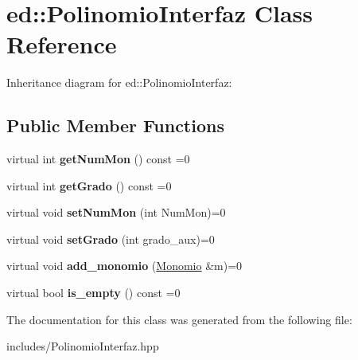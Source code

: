 \hypertarget{classed_1_1PolinomioInterfaz}{}\section{ed\+:\+:Polinomio\+Interfaz Class Reference}
\label{classed_1_1PolinomioInterfaz}


Inheritance diagram for ed\+:\+:Polinomio\+Interfaz\+:
\subsection*{Public Member Functions}
\begin{DoxyCompactItemize}
\item 
\hypertarget{classed_1_1PolinomioInterfaz_a00ccfa8d5f60467dc8521bb909ed583b}{}virtual int {\bfseries get\+Num\+Mon} () const =0\label{classed_1_1PolinomioInterfaz_a00ccfa8d5f60467dc8521bb909ed583b}

\item 
\hypertarget{classed_1_1PolinomioInterfaz_a7d6b7000f661d225b54486165ad4e6fc}{}virtual int {\bfseries get\+Grado} () const =0\label{classed_1_1PolinomioInterfaz_a7d6b7000f661d225b54486165ad4e6fc}

\item 
\hypertarget{classed_1_1PolinomioInterfaz_aedc12dc5787d7d6851785e5dfe530bbe}{}virtual void {\bfseries set\+Num\+Mon} (int Num\+Mon)=0\label{classed_1_1PolinomioInterfaz_aedc12dc5787d7d6851785e5dfe530bbe}

\item 
\hypertarget{classed_1_1PolinomioInterfaz_a09e4b1a5ee9884e5b200e8ad1860d485}{}virtual void {\bfseries set\+Grado} (int grado\+\_\+aux)=0\label{classed_1_1PolinomioInterfaz_a09e4b1a5ee9884e5b200e8ad1860d485}

\item 
\hypertarget{classed_1_1PolinomioInterfaz_adfeeaa40f37bc4f5f222ca72e79a95ae}{}virtual void {\bfseries add\+\_\+monomio} (\hyperlink{classed_1_1Monomio}{Monomio} \&m)=0\label{classed_1_1PolinomioInterfaz_adfeeaa40f37bc4f5f222ca72e79a95ae}

\item 
\hypertarget{classed_1_1PolinomioInterfaz_a681dfce94df26da3700a0ca66e0710fd}{}virtual bool {\bfseries is\+\_\+empty} () const =0\label{classed_1_1PolinomioInterfaz_a681dfce94df26da3700a0ca66e0710fd}

\end{DoxyCompactItemize}


The documentation for this class was generated from the following file\+:\begin{DoxyCompactItemize}
\item 
includes/Polinomio\+Interfaz.\+hpp\end{DoxyCompactItemize}
